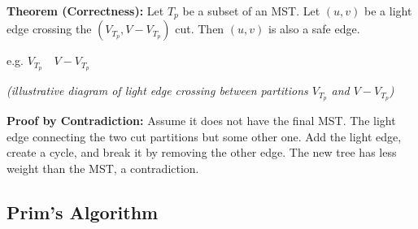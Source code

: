 \begin{derivation}
    \textbf{Theorem (Correctness):} Let \( T_p \) be a subset of an MST. Let \( (u, v) \) be a light edge crossing the \( (V_{T_p}, V - V_{T_p}) \) cut. Then \( (u, v) \) is also a safe edge.

    \begin{center}
    e.g. \( V_{T_p} \quad V - V_{T_p} \)
    \end{center}

    \begin{center}
    \textit{(illustrative diagram of light edge crossing between partitions \( V_{T_p} \) and \( V - V_{T_p} \))}
    \end{center}

    \textbf{Proof by Contradiction:} Assume it does not have the final MST. The light edge connecting the two cut partitions but some other one. Add the light edge, create a cycle, and break it by removing the other edge. The new tree has less weight than the MST, a contradiction.

\end{derivation}

\subsection{Prim's Algorithm}
\begin{definition}
\end{definition}

